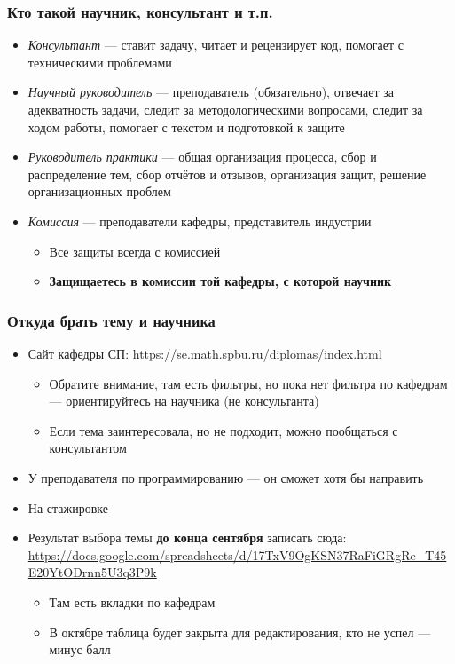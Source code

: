 \documentclass{../../slides-style}
\begin{document}
    \begin{frame}
        \frametitle{Кто такой научник, консультант и т.п.}
        \begin{itemize}
            \item \textit{Консультант} --- ставит задачу, читает и рецензирует код, помогает с техническими проблемами
            \item \textit{Научный руководитель} --- преподаватель (обязательно), отвечает за адекватность задачи, следит за методологическими вопросами, следит за ходом работы, помогает с текстом и подготовкой к защите
            \item \textit{Руководитель практики} --- общая организация процесса, сбор и распределение тем, сбор отчётов и отзывов, организация защит, решение организационных проблем
            \item \textit{Комиссия} --- преподаватели кафедры, представитель индустрии
            \begin{itemize}
                \item Все защиты всегда с комиссией
                \item \textbf{Защищаетесь в комиссии той кафедры, с которой научник}
            \end{itemize}
        \end{itemize}
    \end{frame}

    \begin{frame}
        \frametitle{Откуда брать тему и научника}
        \begin{itemize}
            \item Сайт кафедры СП: \url{https://se.math.spbu.ru/diplomas/index.html}
            \begin{itemize}
                \item Обратите внимание, там есть фильтры, но пока нет фильтра по кафедрам --- ориентируйтесь на научника (не консультанта)
                \item Если тема заинтересовала, но не подходит, можно пообщаться с консультантом
            \end{itemize}
            \item У преподавателя по программированию --- он сможет хотя бы направить
            \item На стажировке
            \item Результат выбора темы \textbf{до конца сентября} записать сюда: \url{https://docs.google.com/spreadsheets/d/17TxV9OgKSN37RaFiGRgRe_T45E20YtODrnn5U3q3P9k}
            \begin{itemize}
                \item Там есть вкладки по кафедрам
                \item В октябре таблица будет закрыта для редактирования, кто не успел --- минус балл
            \end{itemize}
        \end{itemize}
    \end{frame}
\end{document}
